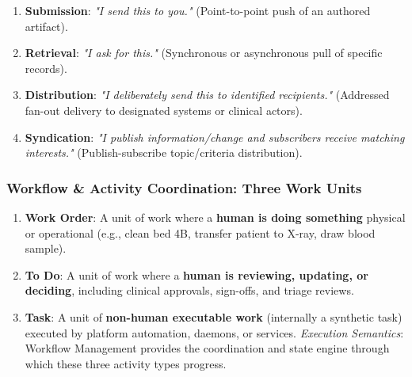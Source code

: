 \begin{enumerate}

\item
\textbf{Submission}: \emph{"I send this to you."} (Point-to-point push of an authored artifact).



\item
\textbf{Retrieval}: \emph{"I ask for this."} (Synchronous or asynchronous pull of specific records).



\item
\textbf{Distribution}: \emph{"I deliberately send this to identified recipients."} (Addressed fan-out delivery to designated systems or clinical actors).



\item
\textbf{Syndication}: \emph{"I publish information/\allowbreak{}change and subscribers receive matching interests."} (Publish-subscribe topic/\allowbreak{}criteria distribution).



\end{enumerate}
\label{rad:enabling:587}
\subsubsection*{Workflow \& Activity Coordination: Three Work Units}
\label{rad:enabling:588}

\begin{enumerate}

\item
\textbf{Work Order}: A unit of work where a \textbf{human is doing something} physical or operational (e.g., clean bed 4B, transfer patient to X-ray, draw blood sample).



\item
\textbf{To Do}: A unit of work where a \textbf{human is reviewing, updating, or deciding}, including clinical approvals, sign-offs, and triage reviews.



\item
\textbf{Task}: A unit of \textbf{non-human executable work} (internally a synthetic task) executed by platform automation, daemons, or services. \emph{Execution Semantics}: Workflow Management provides the coordination and state engine through which these three activity types progress.



\end{enumerate}
\label{rad:enabling:593}
